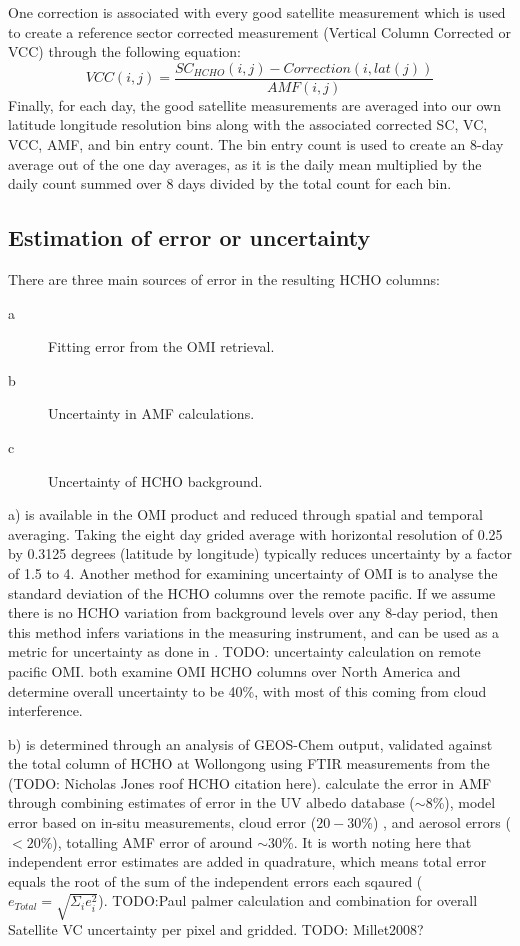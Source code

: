     One correction is associated with every good satellite measurement which is used to create a reference sector corrected measurement (Vertical Column Corrected or VCC) through the following equation:
    \begin{equation}
      VCC(i,j) = \frac{SC_{HCHO}(i,j) - Correction(i,lat(j))}{AMF(i,j)}
    \end{equation}
    Finally, for each day, the good satellite measurements are averaged into our own latitude longitude resolution bins along with the associated corrected SC, VC, VCC, AMF, and bin entry count.
    The bin entry count is used to create an 8-day average out of the one day averages, as it is the daily mean multiplied by the daily count summed over 8 days divided by the total count for each bin.
    
  \subsection{Estimation of error or uncertainty}
  \label{ch_HCHO:sec:OMI_uncertainty_calculation}
    There are three main sources of error in the resulting HCHO columns:
    \begin{description}
      \item[a] Fitting error from the OMI retrieval.
      \item[b] Uncertainty in AMF calculations.
      \item[c] Uncertainty of HCHO background.
    \end{description}

    a) is available in the OMI product and reduced through spatial and temporal averaging.
    Taking the eight day grided average with horizontal resolution of 0.25 by 0.3125 degrees (latitude by longitude) typically reduces uncertainty by a factor of 1.5 to 4.
    Another method for examining uncertainty of OMI is to analyse the standard deviation of the HCHO columns over the remote pacific.
    If we assume there is no HCHO variation from background levels over any 8-day period, then this method infers variations in the measuring instrument, and can be used as a metric for uncertainty as done in \citet{DeSmedt2012}.
    TODO: uncertainty calculation on remote pacific OMI.
    \cite{Millet2006, Palmer2006} both examine OMI HCHO columns over North America and determine overall uncertainty to be 40\%, with most of this coming from cloud interference.

    b) is determined through an analysis of GEOS-Chem output, validated against the total column of HCHO at Wollongong using FTIR measurements from the (TODO: Nicholas Jones roof HCHO citation here).
    \cite{Palmer2006} calculate the error in AMF through combining estimates of error in the UV albedo database ($\sim 8$\%), model error based on in-situ measurements, cloud error  ($20-30$\%) \citep{Martin2003}, and aerosol errors ($<20$\%), totalling AMF error of around $\sim 30$\%.
    It is worth noting here that independent error estimates are added in quadrature, which means total error equals the root of the sum of the independent errors each sqaured ($e_{Total}=\sqrt{\Sigma_i e_i^2}$).
    TODO:Paul palmer calculation and combination for overall Satellite VC uncertainty per pixel and gridded.
    TODO: Millet2008?
    
